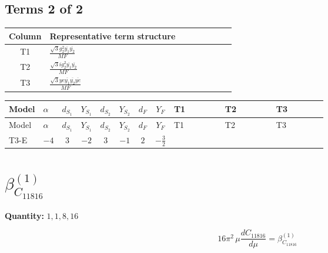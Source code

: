 \documentclass[8pt]{article}
\begin{document}
\begin{landscape}
\subsection*{Terms 2 of 2}
\begin{center}
\begin{tabular}{@{}c >{\raggedright\arraybackslash}p{0.82\linewidth}@{}}
\toprule
Column & Representative term structure \\
\midrule
T1 & \(\displaystyle \frac{\sqrt{3} g_{2}^{2} \overline{y_{1}} \overline{y_{2}}}{MF}\) \\
\midrule
T2 & \(\displaystyle \frac{\sqrt{3} i g_{2}^{2} \overline{y_{1}} \overline{y_{2}}}{MF}\) \\
\midrule
T3 & \(\displaystyle \frac{\sqrt{3} ye \overline{y_{1}} \overline{y_{2}} \overline{ye}}{MF}\) \\
\midrule
\bottomrule
\end{tabular}
\end{center}
\smallskip
\tiny
\begin{longtable}{@{}llcccccc >{\raggedright\arraybackslash}p{0.21\linewidth} >{\raggedright\arraybackslash}p{0.21\linewidth} >{\raggedright\arraybackslash}p{0.21\linewidth}@{}}
\toprule
Model & $\alpha$ & $d_{S_1}$ & $Y_{S_1}$ & $d_{S_2}$ & $Y_{S_2}$ & $d_F$ & $Y_F$ & T1 & T2 & T3 \\
\midrule
\endfirsthead
\toprule
Model & $\alpha$ & $d_{S_1}$ & $Y_{S_1}$ & $d_{S_2}$ & $Y_{S_2}$ & $d_F$ & $Y_F$ & T1 & T2 & T3 \\
\midrule
\endhead
T3-E & $-4$ & $3$ & $-2$ & $3$ & $-1$ & $2$ & $-\frac{3}{2}$ & \scriptsize\adjustbox{max width=\linewidth}{$\begin{gathered} \frac{11 \sqrt{3} g_{2}^{2} \overline{y_{1}} \overline{y_{2}}}{8 MF}\end{gathered}$} & \scriptsize\adjustbox{max width=\linewidth}{$\begin{gathered} - \frac{\sqrt{3} i g_{2}^{2} \overline{y_{1}} \overline{y_{2}}}{6 MF}\end{gathered}$} & \scriptsize\adjustbox{max width=\linewidth}{$\begin{gathered} - \frac{\sqrt{3} ye \overline{y_{1}} \overline{y_{2}} \overline{ye}}{12 MF}\end{gathered}$} \\
\midrule
\bottomrule
\end{longtable}
\clearpage
\section*{$\beta_{C_{11816}}^{(1)}$}
\noindent\textbf{Quantity: }$\mathrm{1,1,8,16}$\par\smallskip
\[16\pi^2\,\mu\frac{d C_{11816}}{d\mu}=\beta_{C_{11816}}^{(1)}\]

\end{landscape}
\end{document}
